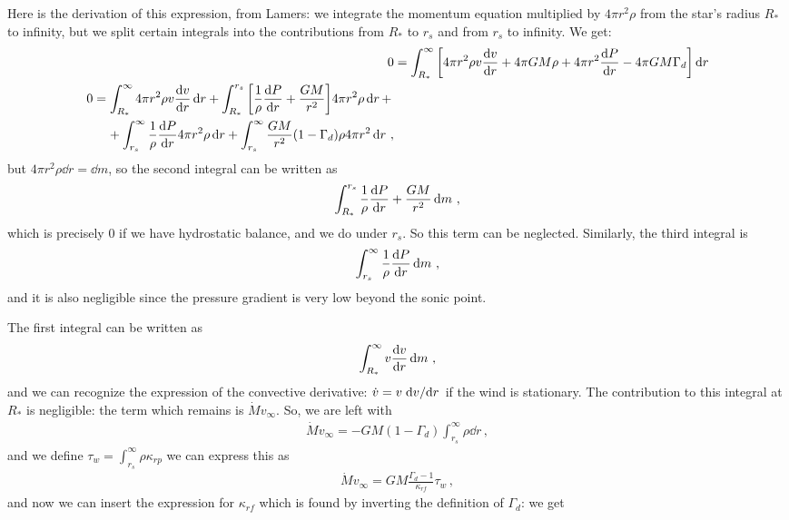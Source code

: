 \documentclass[main.tex]{subfiles}
\begin{document}
\begin{bluebox}
Here is the derivation of this expression, from Lamers:
we integrate the momentum equation multiplied by \(4 \pi r^2 \rho \) from the star's radius \(R_{*}\) to infinity, but we split certain integrals into the contributions from \(R_{*}\) to \(r_s\) and from \(r_s\) to infinity. We get: 
%
\begin{align}
0 &= \int_{R_*}^{ \infty } \qty[ 4 \pi r^2 \rho  v \dv{v}{r} + 4 \pi GM \rho    
+ 4 \pi r^2 \dv{P}{r} - 4 \pi GM \Gamma_{d}] \dd{r}  \\
\begin{split}
0 &= \int_{R_*}^{ \infty } 4 \pi r^2 \rho  v \dv{v}{r} \dd{r}
+ \int_{R_*}^{r_s}  \qty[\frac{1}{\rho } \dv{P}{r} + \frac{GM}{r^2} ] 4 \pi r^2 \rho \dd{r} + \\
&\phantom{=}\ 
+ \int_{r_s}^{ \infty } \frac{1}{\rho } \dv{P}{r} 4 \pi r^2 \rho \dd{r} 
+ \int_{r_s}^{ \infty } \frac{GM}{r^2} (1 - \Gamma_{d})
\rho 4 \pi r^2 \dd{r} 
\,,
\end{split}
\end{align}
%
but \(4 \pi r^2 \rho \dd{r} = \dd{m}\), so the second integral can be written as 
%
\begin{align}
\int_{R_*}^{r_s} \frac{1}{\rho } \dv{P}{r}  + \frac{GM}{r^2}
 \dd{m}
\,,
\end{align}
%
which is precisely 0 if we have hydrostatic balance, and we do under \(r_s\). So this term can be neglected. 
Similarly, the third integral is 
%
\begin{align}
\int_{r_s}^{ \infty } \frac{1}{\rho } \dv{P}{r} \dd{m}
\,,
\end{align}
%
and it is also negligible since the pressure gradient is very low beyond the sonic point.

The first integral can be written as 
%
\begin{align}
\int_{R_*}^{ \infty } v \dv{v}{r} \dd{m}
\,,
\end{align}
%
and we can recognize the expression of the convective derivative: \(\dot{v}  = v \dv*{v}{r}\) if the wind is stationary. The contribution to this integral at \(R_*\) is negligible: the term which remains is \(\dot{M} v_{ \infty }\). So, we are left with 
%
\begin{align}
\dot{M} v_{ \infty } = - GM (1- \Gamma_{d}) \int_{r_s}^{ \infty }
\rho \dd{r}
\,,
\end{align}
%
and we define \(\tau_{w} = \int_{r_s}^{ \infty } \rho \kappa_{rp}\) we can express this as 
%
\begin{align}
\dot{M} v_{ \infty } = GM \frac{\Gamma_{d} -1 }{\kappa_{rf}} \tau_{w}
\,,
\end{align}
%
and now we can insert the expression for \(\kappa_{rf}\) which is found by inverting the definition of \(\Gamma_{d}\): we get
\end{bluebox}
\end{document}
